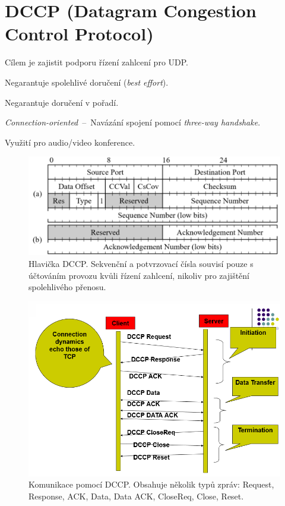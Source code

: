 
\section{DCCP (Datagram Congestion Control Protocol)}

\begin{compactitem}
    \item Cílem je zajistit podporu řízení zahlcení pro UDP.
    \item Negarantuje spolehlivé doručení (\textit{best effort}).
    \item Negarantuje doručení v pořadí.
    \item \textit{Connection-oriented}~--~Navázání spojení pomocí \textit{three-way handshake}.
    \item Využití pro audio/video konference.
\end{compactitem}

\begin{figure}[H]
    \centering
    \includegraphics[width=0.75\linewidth]{dccp_header.png}
    \caption{Hlavička DCCP. Sekvenční a potvrzovací čísla souvisí pouze s účtováním provozu kvůli řízení zahlcení, nikoliv pro zajištění spolehlivého přenosu.}
\end{figure}

\begin{figure}[H]
    \centering
    \includegraphics[width=0.75\linewidth]{dccp_spojeni.png}
    \caption{Komunikace pomocí DCCP. Obsahuje několik typů zpráv: Request, Response, ACK, Data, Data ACK, CloseReq, Close, Reset.}
\end{figure}

